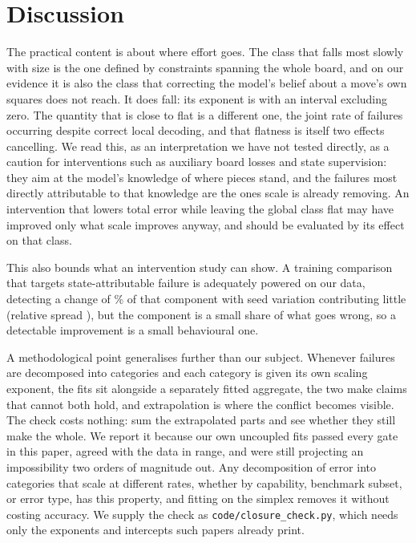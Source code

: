 \documentclass[11pt]{article}
\begin{document}
\section{Discussion}

The practical content is about where effort goes. The class that falls most slowly
with size is the one defined by constraints spanning the whole board, and on our
evidence it is also the class that correcting the model's belief about a move's own
squares does not reach. It does fall: its exponent is  with an interval
excluding zero. The quantity that is close to flat is a different one, the joint rate
of failures occurring despite correct local decoding, and that flatness is itself two
effects cancelling. We read this, as an interpretation we have not tested
directly, as a caution for interventions such as auxiliary board losses and state
supervision: they aim at the model's knowledge of where pieces stand, and the
failures most directly attributable to that knowledge are the ones scale is already
removing. An intervention that lowers total error while leaving the global class
flat may have improved only what scale improves anyway, and should be evaluated by
its effect on that class.

This also bounds what an intervention study can show. A training comparison that
targets state-attributable failure is adequately powered on our data, detecting a
change of \% of that component with seed variation contributing
little (relative spread ), but the component is a small share of
what goes wrong, so a detectable improvement is a small behavioural one.

A methodological point generalises further than our subject. Whenever failures are
decomposed into categories and each category is given its own scaling exponent, the
fits sit alongside a separately fitted aggregate, the two make claims that cannot
both hold, and extrapolation is where the conflict becomes visible. The check costs nothing: sum the extrapolated parts and see whether they
still make the whole. We report it because our own uncoupled fits passed every gate
in this paper, agreed with the data in range, and were still projecting an
impossibility two orders of magnitude out. Any decomposition of error into
categories that scale at different rates, whether by capability, benchmark subset,
or error type, has this property, and fitting on the simplex removes it without
costing accuracy. We supply the check as \texttt{code/closure\_check.py}, which
needs only the exponents and intercepts such papers already print.
\end{document}
